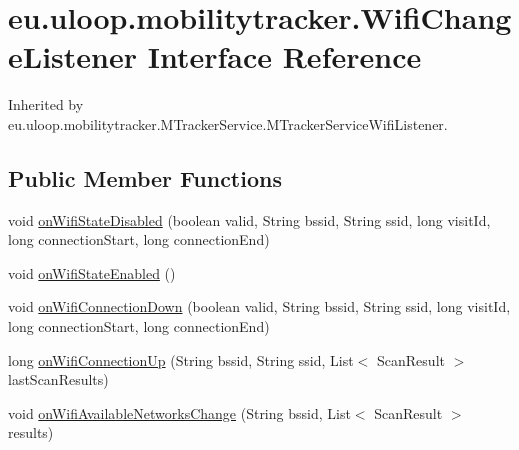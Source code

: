 \hypertarget{interfaceeu_1_1uloop_1_1mobilitytracker_1_1WifiChangeListener}{\section{eu.\+uloop.\+mobilitytracker.\+Wifi\+Change\+Listener Interface Reference}
\label{interfaceeu_1_1uloop_1_1mobilitytracker_1_1WifiChangeListener}
}


Inherited by eu.\+uloop.\+mobilitytracker.\+M\+Tracker\+Service.\+M\+Tracker\+Service\+Wifi\+Listener.

\subsection*{Public Member Functions}
\begin{DoxyCompactItemize}
\item 
void \hyperlink{interfaceeu_1_1uloop_1_1mobilitytracker_1_1WifiChangeListener_adaaef9d32d4cb835b49b5d3c0bf2aebe}{on\+Wifi\+State\+Disabled} (boolean valid, String bssid, String ssid, long visit\+Id, long connection\+Start, long connection\+End)
\item 
void \hyperlink{interfaceeu_1_1uloop_1_1mobilitytracker_1_1WifiChangeListener_af05047c30f56bcd75c08b703faf3cb18}{on\+Wifi\+State\+Enabled} ()
\item 
void \hyperlink{interfaceeu_1_1uloop_1_1mobilitytracker_1_1WifiChangeListener_a0e93d004d3c09bf2622fad80f9f85fb6}{on\+Wifi\+Connection\+Down} (boolean valid, String bssid, String ssid, long visit\+Id, long connection\+Start, long connection\+End)
\item 
long \hyperlink{interfaceeu_1_1uloop_1_1mobilitytracker_1_1WifiChangeListener_a6a0aacf2d36131d7a49f29bf56e4b3e2}{on\+Wifi\+Connection\+Up} (String bssid, String ssid, List$<$ Scan\+Result $>$ last\+Scan\+Results)
\item 
void \hyperlink{interfaceeu_1_1uloop_1_1mobilitytracker_1_1WifiChangeListener_aa7914e455b236cb3187024011b7660a2}{on\+Wifi\+Available\+Networks\+Change} (String bssid, List$<$ Scan\+Result $>$ results)
\end{DoxyCompactItemize}


